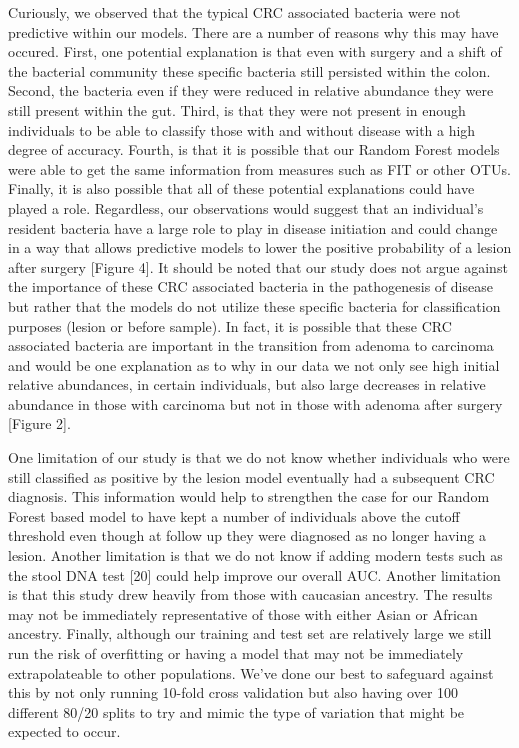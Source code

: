 \documentclass[12pt,]{article}
\begin{document}
Curiously, we observed that the typical CRC associated bacteria were not
predictive within our models. There are a number of reasons why this may
have occured. First, one potential explanation is that even with surgery
and a shift of the bacterial community these specific bacteria still
persisted within the colon. Second, the bacteria even if they were
reduced in relative abundance they were still present within the gut.
Third, is that they were not present in enough individuals to be able to
classify those with and without disease with a high degree of accuracy.
Fourth, is that it is possible that our Random Forest models were able
to get the same information from measures such as FIT or other OTUs.
Finally, it is also possible that all of these potential explanations
could have played a role. Regardless, our observations would suggest
that an individual's resident bacteria have a large role to play in
disease initiation and could change in a way that allows predictive
models to lower the positive probability of a lesion after surgery
{[}Figure 4{]}. It should be noted that our study does not argue against
the importance of these CRC associated bacteria in the pathogenesis of
disease but rather that the models do not utilize these specific
bacteria for classification purposes (lesion or before sample). In fact,
it is possible that these CRC associated bacteria are important in the
transition from adenoma to carcinoma and would be one explanation as to
why in our data we not only see high initial relative abundances, in
certain individuals, but also large decreases in relative abundance in
those with carcinoma but not in those with adenoma after surgery
{[}Figure 2{]}.

One limitation of our study is that we do not know whether individuals
who were still classified as positive by the lesion model eventually had
a subsequent CRC diagnosis. This information would help to strengthen
the case for our Random Forest based model to have kept a number of
individuals above the cutoff threshold even though at follow up they
were diagnosed as no longer having a lesion. Another limitation is that
we do not know if adding modern tests such as the stool DNA test
{[}20{]} could help improve our overall AUC. Another limitation is that
this study drew heavily from those with caucasian ancestry. The results
may not be immediately representative of those with either Asian or
African ancestry. Finally, although our training and test set are
relatively large we still run the risk of overfitting or having a model
that may not be immediately extrapolateable to other populations. We've
done our best to safeguard against this by not only running 10-fold
cross validation but also having over 100 different 80/20 splits to try
and mimic the type of variation that might be expected to occur.
\end{document}
